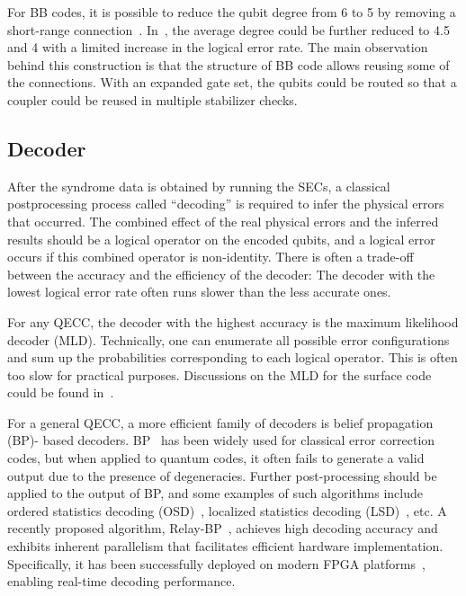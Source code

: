 \documentclass[a4paper,onecolumn,11pt,unpublished]{quantumarticle}
\begin{document}
For BB codes, it is possible to reduce the qubit degree from 6 to 5 by removing a short-range connection~\cite{Shaw2025lowering}. In~\cite{zhou2025louvrerelaxinghardwarerequirements}, the average degree could be further reduced to 4.5 and 4 with a limited increase in the logical error rate. The main observation behind this construction is that the structure of BB code allows reusing some of the connections. With an expanded gate set, the qubits could be routed so that a coupler could be reused in multiple stabilizer checks.

\subsection{Decoder}
After the syndrome data is obtained by running the SECs, a classical postprocessing process called ``decoding'' is required to infer the physical errors that occurred. The combined effect of the real physical errors and the inferred results should be a logical operator on the encoded qubits, and a logical error occurs if this combined operator is non-identity. There is often a trade-off between the accuracy and the efficiency of the decoder: The decoder with the lowest logical error rate often runs slower than the less accurate ones.

For any QECC, the decoder with the highest accuracy is the maximum likelihood decoder (MLD). Technically, one can enumerate all possible error configurations and sum up the probabilities corresponding to each logical operator. This is often too slow for practical purposes. Discussions on the MLD for the surface code could be found in~\cite{dennis2002topological}.

For a general QECC, a more efficient family of decoders is belief propagation (BP)- based decoders. BP~\cite{mackay1997near} has been widely used for classical error correction codes, but when applied to quantum codes, it often fails to generate a valid output due to the presence of degeneracies. Further post-processing should be applied to the output of BP, and some examples of such algorithms include ordered statistics decoding (OSD)~\cite{Panteleev2021degeneratequantum,roffe2020decoding}, localized statistics decoding (LSD)~\cite{hillmann2025localized}, etc. A recently proposed algorithm, Relay-BP~\cite{muller2025improvedbeliefpropagationsufficient}, achieves high decoding accuracy and exhibits inherent parallelism that facilitates efficient hardware implementation. Specifically, it has been successfully deployed on modern FPGA platforms~\cite{maurer2025realtimedecodinggrosscode}, enabling real-time decoding performance.
\end{document}
